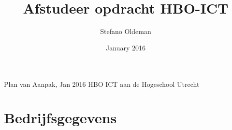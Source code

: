 \documentclass{report} %
\title{Afstudeer opdracht HBO-ICT}
\author{Stefano Oldeman}
\date{January 2016}
\begin{document}
\begin{titlepage}

\begin{center}
    
    Plan van Aanpak, Jan 2016
    HBO ICT aan de Hogeschool Utrecht
\end{center}
\end{titlepage}


\maketitle


\tableofcontents{}








\appendix
 
\chapter{Bedrijfsgegevens} %



\printbibliography
\end{document}
